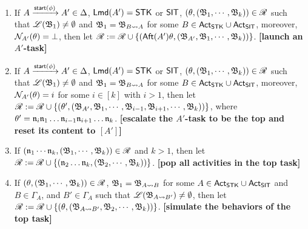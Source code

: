 \smallskip
\fbox
{
\begin{minipage}{0.9\textwidth}
\begin{enumerate}
    \item If $A \xrightarrow{{\mathsf{start} }(\phi)}A' \in\Delta$, ${\sf Lmd}(A')=\mathsf{STK}$ or ${\sf SIT}$, $(\theta, ({\mathfrak{B} }_1,\cdots,{\mathfrak{B} }_k)) \in \mathscr{R}$ such that ${\mathscr{L} }({\mathfrak{B} }_1) \neq \emptyset$ and ${\mathfrak{B} }_1 = {\mathfrak{B} }_{B\rightsquigarrow A}$ for some $B \in {\sf Act}_{\sf STK}\cup{\sf Act}_{\sf SIT}$, moreover, $\mathcal{N}_{A'}(\theta) = \bot$,
    then let $\mathscr{R}: = \mathscr{R} \cup \{({\sf Aft}(A')\theta, ({\mathfrak{B} }_{A'},{\mathfrak{B} }_1,\cdots,{\mathfrak{B} }_k))\}$.
        \textbf{[launch an $A'$-task]}

    \item If $A \xrightarrow{{\mathsf{start} }(\phi)}A' \in\Delta$, ${\sf Lmd}(A')=\mathsf{STK}$ or ${\sf SIT}$, $(\theta, ({\mathfrak{B} }_1,\cdots,{\mathfrak{B} }_k)) \in \mathscr{R}$ such that ${\mathscr{L} }({\mathfrak{B} }_1) \neq \emptyset$ and ${\mathfrak{B} }_1 = {\mathfrak{B} }_{B\rightsquigarrow A}$ for some $B \in {\sf Act}_{\sf STK}\cup{\sf Act}_{\sf SIT}$, moreover, $\mathcal{N}_{A'}(\theta) = i$ for some $i \in [k]$ with $i > 1$, 
        then let $\mathscr{R}:= \mathscr{R} \cup \{(\theta', ({\mathfrak{B} }_{A'}, {\mathfrak{B} }_1, \cdots,{\mathfrak{B} }_{i-1},{\mathfrak{B} }_{i+1},\cdots,{\mathfrak{B} }_{k}))\}$, where $\theta' = \mathfrak{n}_i\mathfrak{n}_1\dots\mathfrak{n}_{i-1}\mathfrak{n}_{i+1}\dots\mathfrak{n}_k$. 
        \textbf{[escalate the $A'$-task to be the top and reset its content to $[A']$]}
    \item If $(\mathfrak{n}_1 \cdots \mathfrak{n}_k, ({\mathfrak{B} }_1,\cdots,{\mathfrak{B} }_k)) \in \mathscr{R}$ and $k>1$, then let $\mathscr{R} := \mathscr{R} \cup \{(\mathfrak{n}_2\dots\mathfrak{n}_k, ({\mathfrak{B} }_2,\cdots,{\mathfrak{B} }_k))\}$.
        \textbf{[pop all activities in the top task]}
%
    \item If $(\theta, ({\mathfrak{B} }_1,\cdots,{\mathfrak{B} }_k)) \in \mathscr{R}$, ${\mathfrak{B} }_1 = {\mathfrak{B} }_{A\rightsquigarrow B}$ for some $A\in{\sf Act}_{\mathsf{STK}}\cup{\sf Act}_{\mathsf{SIT}}$ and $B \in \Gamma_A$, and $B'  \in \Gamma_A$ such that ${\mathscr{L} }({\mathfrak{B} }_{A\rightsquigarrow B'}) \neq \emptyset$, then let 
    $\mathscr{R} := \mathscr{R} \cup \{(\theta, ({\mathfrak{B} }_{A\rightsquigarrow B'}, {\mathfrak{B} }_2,\cdots,{\mathfrak{B} }_k))\}$. 
        \textbf{[simulate the behaviors of the top task]}
\end{enumerate}
\end{minipage}
}

